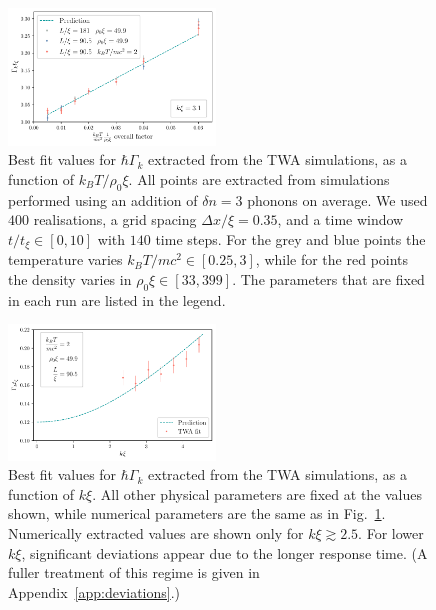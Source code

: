 \documentclass[aps,prd,notitlepage,amsfonts,amssymb,amsmath,nofootinbib,superscriptaddress,longbibliography]{revtex4-2}
\begin{document}
\begin{figure}
    \centering
    \includegraphics[width=0.49\textwidth]{fig2.pdf}
    \caption{Best fit values for $\hbar \Gamma_k$ extracted from the TWA simulations, as a function of $k_{B} T/ \rho_{0}\xi$.
    All points are extracted from simulations performed using an addition of $\delta n = 3$ phonons on average.
    We used $400$ realisations, a grid spacing $\Delta x/\xi = 0.35$,
    and %
    a time window $t / t_{\xi} \in \left[ 0, 10\right]$ with $140$ time steps. 
    For the grey and blue points the temperature varies $k_{B} T/ m c^2 \in \left[ 0.25 , 3 \right]$, while for the red points the density varies in $\rho_0 \xi \in \left[ 33 , 399 \right]$. The parameters that are fixed in each run are listed in the legend.
    \label{fig:scaling_Gamma_asap_T}}
\end{figure}

\begin{figure}
    \centering
    \includegraphics[width=0.49\textwidth]{fig3.pdf}
    \caption{Best fit values for $\hbar \Gamma_k$ extracted from the TWA simulations, as a function of $k \xi$. All other physical parameters are fixed at the values shown, while numerical parameters are the same as in Fig.~\ref{fig:scaling_Gamma_asap_T}.
    Numerically extracted values are shown only for $k\xi \gtrsim 2.5$.  For lower $k\xi$, significant deviations appear due to the longer response time. (A fuller treatment of this regime is given in Appendix~\ref{app:deviations}.)
    \label{fig:scaling_Gamma_k_xi}}
\end{figure}
\end{document}

